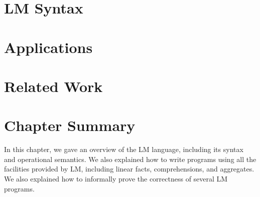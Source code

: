 \section{LM Syntax}

\section{Applications}


\section{Related Work}\label{section:language:related}

\section{Chapter Summary}

In this chapter, we gave an overview of the LM language, including its syntax
and operational semantics. We also explained how to write programs using all the
facilities provided by LM, including linear facts, comprehensions, and
aggregates. We also explained how to informally prove the correctness of several
LM programs.
